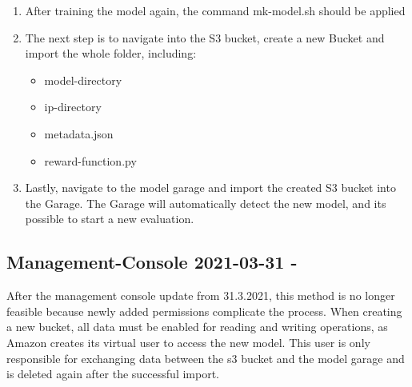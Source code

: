 \begin{enumerate}
    \item After training the model again, the command mk-model.sh should be applied 
    \item The next step is to navigate into the S3 bucket, create a new Bucket and import the whole folder, including:
    \begin{itemize}
        \item model-directory
        \item ip-directory
        \item metadata.json
        \item reward-function.py
    \end{itemize}
    \item Lastly, navigate to the model garage and import the created S3 bucket into the Garage. The Garage will automatically detect the new model, and its possible to start a new evaluation.
\end{enumerate}

\subsection{Management-Console 2021-03-31 - }
After the management console update from 31.3.2021, this method is no longer feasible because newly added permissions complicate the process. When creating a new bucket, all data must be enabled for reading and writing operations, as Amazon creates its virtual user to access the new model. This user is only responsible for exchanging data between the s3 bucket and the model garage and is deleted again after the successful import.

